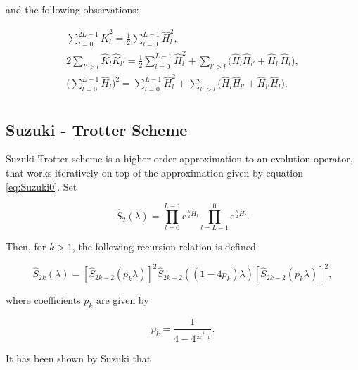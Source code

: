     \noindent and the following observations:

    \begin{equation}
      \begin{gathered}
        \sum_{l = 0}^{2L-1} \hat{K}_l^2 = \frac{1}{2}\sum_{l = 0}^{L-1} \hat{H}_l^2, \\
        2\sum_{l' > l} \hat{K}_{l} \hat{K}_{l'} = \frac{1}{2}\sum_{l = 0}^{L-1} \hat{H}_l^2 + \sum_{l'> l} \Bigg( \hat{H}_{l} \hat{H}_{l'} + \hat{H}_{l'} \hat{H}_{l}\Bigg), \\
        \Bigg(\sum_{l = 0}^{L-1} \hat{H}_l \Bigg)^2 = \sum_{l = 0}^{L-1} \hat{H}_l^2 + \sum_{l'> l} \Bigg( \hat{H}_{l} \hat{H}_{l'} + \hat{H}_{l'} \hat{H}_{l}\Bigg). \\
      \end{gathered}
    \end{equation}

  \subsection{Suzuki - Trotter Scheme}
  \label{subsec:SuzukiTrotter}

    Suzuki-Trotter scheme is a higher order approximation to an evolution operator, that works iteratively on top of the approximation given by equation \ref{eq:Suzuki0}. Set \cite{SuzukiFormula, BerryErrorBounds}

    \begin{equation}
      \hat{S}_2(\lambda) = \prod_{l = 0}^{L-1} \mathrm{e}^{\frac{\lambda}{2}\hat{H}_l} \prod_{l = L-1}^{0} \mathrm{e}^{\frac{\lambda}{2}\hat{H}_l}.
      \label{eq:SuzukiInit}
    \end{equation}

    Then, for $k > 1$, the following recursion relation is defined

    \begin{equation}
      \hat{S}_{2k}(\lambda) = [\hat{S}_{2k-2}(p_k\lambda)]^2 \hat{S}_{2k-2}((1 - 4 p_k)\lambda) [\hat{S}_{2k-2}(p_k\lambda)]^2,
      \label{eq:SuzukiRecursion}
    \end{equation}

    \noindent where coefficients $p_k$ are given by

    \begin{equation}
      p_k = \frac{1}{4 - 4^{\frac{1}{2k-1}}}.
      \label{eq:pk}
    \end{equation}

    It has been shown by Suzuki that \cite{SuzukiFormula}

